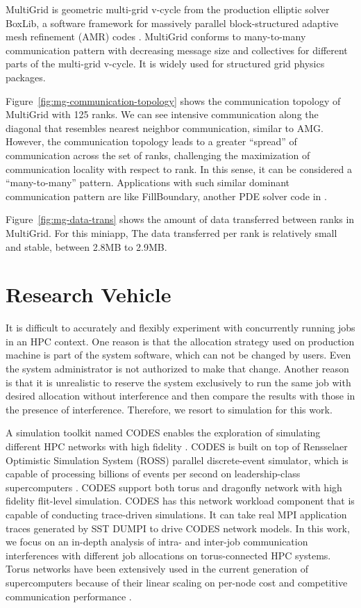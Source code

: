 \documentclass[conference]{IEEEtran}
\begin{document}
MultiGrid is geometric multi-grid v-cycle from the production elliptic solver BoxLib, a software framework for massively parallel block-structured adaptive mesh refinement (AMR) codes \cite{boxlib}. MultiGrid conforms to many-to-many communication pattern with decreasing message size and collectives for different parts of the multi-grid v-cycle. It is widely used for structured grid physics packages. 

Figure~\ref{fig:mg-communication-topology} shows the communication topology of MultiGrid with 125 ranks. We can see intensive communication along the diagonal that resembles nearest neighbor communication, similar to AMG. However, the communication topology leads to a greater ``spread'' of communication across the set of ranks, challenging the maximization of communication locality with respect to rank. In this sense, it can be considered a ``many-to-many'' pattern. Applications with such similar dominant communication pattern are like FillBoundary, another PDE solver code in \cite{boxlib}.

Figure~\ref{fig:mg-data-trans} shows the amount of data transferred between ranks in MultiGrid. For this miniapp, The data transferred per rank is relatively small and stable, between 2.8MB to 2.9MB.



\section{Research Vehicle}
\label{sec:codes}

It is difficult to accurately and flexibly experiment with concurrently running jobs in an HPC context. One reason is that the allocation strategy used on production machine is part of the system software, which can not be changed by users. Even the system administrator is not authorized to make that change. Another reason is that it is unrealistic to reserve the system exclusively to run the same job with desired allocation without interference and then compare the results with those in the presence of interference. Therefore, we resort to simulation for this work.


A simulation toolkit named CODES enables the exploration of simulating different HPC networks with high fidelity \cite{Jason-2011}\cite{mubarak-sc2012}. CODES is built on top of Rensselaer Optimistic Simulation System (ROSS) parallel discrete-event simulator, which is capable of processing billions of events per second on leadership-class supercomputers \cite{ross}. CODES support both torus and dragonfly network with high fidelity flit-level simulation. CODES has this network workload component that is capable of conducting trace-driven simulations. It can take real MPI application traces generated by SST DUMPI \cite{sst} to drive CODES network models. In this work, we focus on an in-depth analysis of intra- and inter-job communication interferences with  different job allocations on torus-connected HPC systems. Torus networks have been extensively used in the current generation of supercomputers because of their linear scaling on per-node cost and competitive communication performance \cite{mubarak-sc2012}\cite{zhou-ipdps}.
\end{document}
